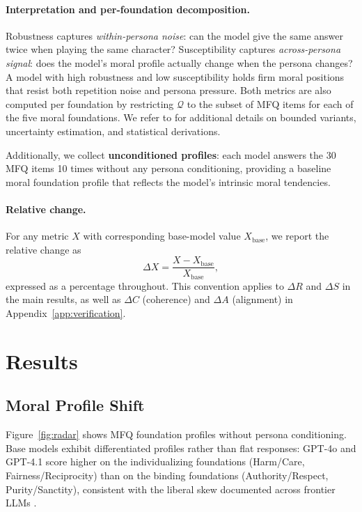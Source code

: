 \documentclass{article}
\begin{document}
\paragraph{Interpretation and per-foundation decomposition.} Robustness captures \emph{within-persona noise}: can the model give the same answer twice when playing the same character? Susceptibility captures \emph{across-persona signal}: does the model's moral profile actually change when the persona changes? A model with high robustness and low susceptibility holds firm moral positions that resist both repetition noise and persona pressure. Both metrics are also computed per foundation by restricting $\mathcal{Q}$ to the subset of MFQ items for each of the five moral foundations. We refer to \citet{costa2025moral} for additional details on bounded variants, uncertainty estimation, and statistical derivations.

Additionally, we collect \textbf{unconditioned profiles}: each model answers the 30 MFQ items 10 times without any persona conditioning, providing a baseline moral foundation profile that reflects the model's intrinsic moral tendencies.

\paragraph{Relative change.} For any metric $X$ with corresponding base-model value $X_{\text{base}}$, we report the relative change as
\begin{equation}
  \Delta X = \frac{X - X_{\text{base}}}{X_{\text{base}}},
  \label{eq:delta}
\end{equation}
expressed as a percentage throughout. This convention applies to $\Delta R$ and $\Delta S$ in the main results, as well as $\Delta C$ (coherence) and $\Delta A$ (alignment) in Appendix~\ref{app:verification}.


\section{Results}

\subsection{Moral Profile Shift}

Figure~\ref{fig:radar} shows MFQ foundation profiles without persona conditioning. Base models exhibit differentiated profiles rather than flat responses: GPT-4o and GPT-4.1 score higher on the individualizing foundations (Harm/Care, Fairness/Reciprocity) than on the binding foundations (Authority/Respect, Purity/Sanctity), consistent with the liberal skew documented across frontier LLMs \citep{graham2009liberals,abdulhai-etal-2024-moral,kirgis2025differences,hartmann2023political}.
\end{document}
